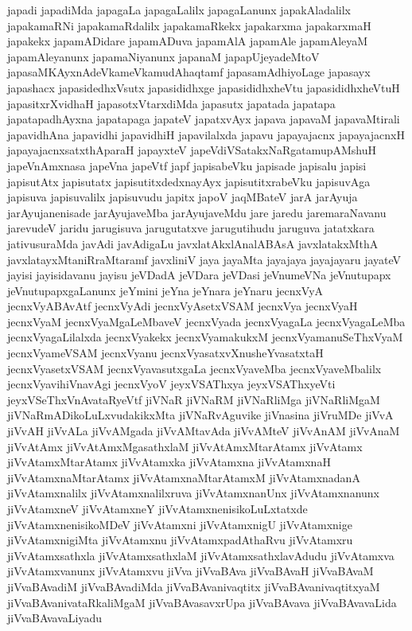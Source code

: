 {japadi
japadiMda
japagaLa
japagaLalilx
japagaLanunx
japakAladalilx
japakamaRNi
japakamaRdalilx
japakamaRkekx
japakarxma
japakarxmaH
japakekx
japamADidare
japamADuva
japamAlA
japamAle
japamAleyaM
japamAleyanunx
japamaNiyanunx
japanaM
japapUjeyadeMtoV
japasaMKAyxnAdeVkameVkamudAhaqtamf
japasamAdhiyoLage
japasayx
japashacx
japasidedhxVsutx
japasididhxge
japasididhxheVtu
japasididhxheVtuH
japasitxrXvidhaH
japasotxVtarxdiMda
japasutx
japatada
japatapa
japatapadhAyxna
japatapaga
japateV
japatxvAyx
japava
japavaM
japavaMtirali
japavidhAna
japavidhi
japavidhiH
japavilalxda
japavu
japayajacnx
japayajacnxH
japayajacnxsatxthAparaH
japayxteV
japeVdiVSatakxNaRgatamupAMshuH
japeVnAmxnasa
japeVna
japeVtf
japf
japisabeVku
japisade
japisalu
japisi
japisutAtx
japisutatx
japisutitxdedxnayAyx
japisutitxrabeVku
japisuvAga
japisuva
japisuvalilx
japisuvudu
japitx
japoV
jaqMBateV
jarA
jarAyuja
jarAyujanenisade
jarAyujaveMba
jarAyujaveMdu
jare
jaredu
jaremaraNavanu
jarevudeV
jaridu
jarugisuva
jarugutatxve
jarugutihudu
jaruguva
jatatxkara
jativusuraMda
javAdi
javAdigaLu
javxlatAkxlAnalABAsA
javxlatakxMthA
javxlatayxMtaniRraMtaramf
javxliniV
jaya
jayaMta
jayajaya
jayajayaru
jayateV
jayisi
jayisidavanu
jayisu
jeVDadA
jeVDara
jeVDasi
jeVnumeVNa
jeVnutupapx
jeVnutupapxgaLanunx
jeYmini
jeYna
jeYnara
jeYnaru
jecnxVyA
jecnxVyABAvAtf
jecnxVyAdi
jecnxVyAsetxVSAM
jecnxVya
jecnxVyaH
jecnxVyaM
jecnxVyaMgaLeMbaveV
jecnxVyada
jecnxVyagaLa
jecnxVyagaLeMba
jecnxVyagaLilalxda
jecnxVyakekx
jecnxVyamakukxM
jecnxVyamanuSeThxVyaM
jecnxVyameVSAM
jecnxVyanu
jecnxVyasatxvXnusheYvasatxtaH
jecnxVyasetxVSAM
jecnxVyavasutxgaLa
jecnxVyaveMba
jecnxVyaveMbalilx
jecnxVyavihiVnavAgi
jecnxVyoV
jeyxVSAThxya
jeyxVSAThxyeVti
jeyxVSeThxVnAvataRyeVtf
jiVNaR
jiVNaRM
jiVNaRliMga
jiVNaRliMgaM
jiVNaRmADikoLuLxvudakikxMta
jiVNaRvAguvike
jiVnasina
jiVruMDe
jiVvA
jiVvAH
jiVvALa
jiVvAMgada
jiVvAMtavAda
jiVvAMteV
jiVvAnAM
jiVvAnaM
jiVvAtAmx
jiVvAtAmxMgasathxlaM
jiVvAtAmxMtarAtamx
jiVvAtamx
jiVvAtamxMtarAtamx
jiVvAtamxka
jiVvAtamxna
jiVvAtamxnaH
jiVvAtamxnaMtarAtamx
jiVvAtamxnaMtarAtamxM
jiVvAtamxnadanA
jiVvAtamxnalilx
jiVvAtamxnalilxruva
jiVvAtamxnanUnx
jiVvAtamxnanunx
jiVvAtamxneV
jiVvAtamxneY
jiVvAtamxnenisikoLuLxtatxde
jiVvAtamxnenisikoMDeV
jiVvAtamxni
jiVvAtamxnigU
jiVvAtamxnige
jiVvAtamxnigiMta
jiVvAtamxnu
jiVvAtamxpadAthaRvu
jiVvAtamxru
jiVvAtamxsathxla
jiVvAtamxsathxlaM
jiVvAtamxsathxlavAdudu
jiVvAtamxva
jiVvAtamxvanunx
jiVvAtamxvu
jiVva
jiVvaBAva
jiVvaBAvaH
jiVvaBAvaM
jiVvaBAvadiM
jiVvaBAvadiMda
jiVvaBAvanivaqtitx
jiVvaBAvanivaqtitxyaM
jiVvaBAvanivataRkaliMgaM
jiVvaBAvasavxrUpa
jiVvaBAvava
jiVvaBAvavaLida
jiVvaBAvavaLiyadu
}
